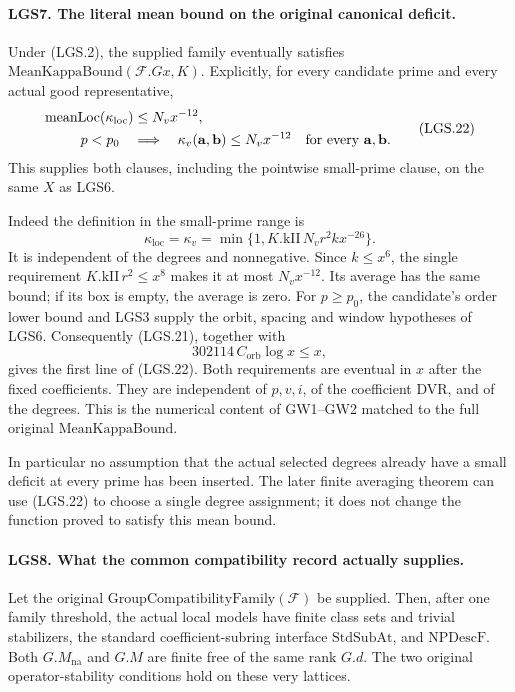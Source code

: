 \paragraph{LGS7. The literal mean bound on the original canonical deficit.}
\label{claim:LGS7}
Under (LGS.2), the supplied family eventually satisfies
\(\mathrm{MeanKappaBound}(\mathcal F.Gx,K)\).
Explicitly, for every candidate prime and every actual good
representative,
\[
 \begin{split}
 \operatorname{meanLoc}(\kappa_{\mathrm{loc}})
       &\le N_vx^{-12},\\
 p<p_0\quad&\Longrightarrow\quad
       \kappa_v(\mathbf a,\mathbf b)\le N_vx^{-12}
       \quad\hbox{for every }\mathbf a,\mathbf b.
 \end{split}                                                     \tag{LGS.22}
\]
This supplies both clauses, including the pointwise
small-prime clause, on the same \(X\) as LGS6.

Indeed the definition in the small-prime range is
\[
 \kappa_{\mathrm{loc}}=\kappa_v
     =\min\{1,K.\mathrm{kII}\,N_vr^2k x^{-26}\}.
 \]
It is independent of the degrees and nonnegative.  Since
\(k\le x^6\), the single requirement
\(K.\mathrm{kII}\,r^2\le x^8\) makes it at most
\(N_vx^{-12}\).  Its average has the same bound; if its
box is empty, the average is zero.
For \(p\ge p_0\), the candidate's order lower bound and
LGS3 supply the orbit, spacing and window hypotheses of
LGS6.  Consequently (LGS.21), together with
\[
                302114\,C_{\mathrm{orb}}\log x\le x,   \tag{LGS.23}
\]
gives the first line of (LGS.22).  Both requirements are
eventual in \(x\) after the fixed coefficients.  They are
independent of \(p,v,i\), of the coefficient DVR, and of
the degrees.  This is the numerical content of GW1--GW2
matched to the full original \(\mathrm{MeanKappaBound}\).

In particular no assumption that the actual selected
degrees already have a small deficit at every prime has
been inserted.  The later finite averaging theorem can
use (LGS.22) to choose a single degree assignment; it does
not change the function proved to satisfy this mean bound.

\paragraph{LGS8. What the common compatibility record actually supplies.}
\label{claim:LGS8}
Let the original \(\mathrm{GroupCompatibilityFamily}(\mathcal F)\)
be supplied.  Then, after one family threshold, the actual
local models have finite class sets and trivial stabilizers,
the standard coefficient-subring interface
\(\mathrm{StdSubAt}\), and \(\mathrm{NPDescF}\).
Both \(G.M_{\mathrm{na}}\) and \(G.M\) are finite free of the
same rank \(G.d\).  The two original operator-stability
conditions hold on these very lattices.

